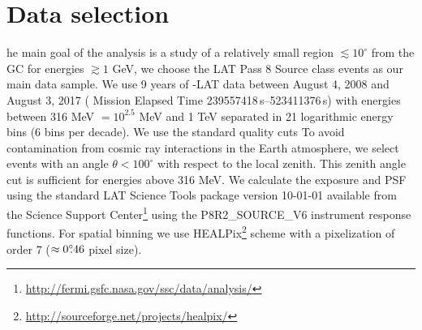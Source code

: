 \section{Data selection}

he main goal of the analysis is a study of a relatively small region $\lesssim 10^\circ$ from the GC for energies $\gtrsim 1$ GeV,
we choose the \Fermi LAT Pass 8 Source class events as our main data sample.
We use 9 years of {\Fermi}-LAT data between August 4, 2008  and August 3, 2017 ({\Fermi} Mission Elapsed Time 239557418\,s--523411376\,s)
with energies between 316 MeV $ = 10^{2.5}$ MeV
and 1 TeV separated in 21 logarithmic energy bins (6 bins per decade).
We use the standard quality cuts 
To avoid contamination from cosmic ray interactions in the Earth atmosphere, 
we select events with an angle $\theta < 100^{\circ}$ with respect to the local zenith.
This zenith angle cut is sufficient for energies above 316 MeV.
We calculate the exposure and PSF using the standard {\Fermi} LAT Science Tools package version 
10-01-01 available from the {\Fermi} Science Support Center\footnote{\url{http://fermi.gsfc.nasa.gov/ssc/data/analysis/}} 
using the P8R2\_SOURCE\_V6 instrument response functions.
For spatial binning we use HEALPix\footnote{\url{http://sourceforge.net/projects/healpix/}} \citep{2005ApJ...622..759G} scheme with a pixelization of order 7  ($\approx 0^\circ\!\!.46$ pixel size). 